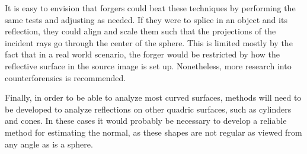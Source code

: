 \documentclass{thesis}
\begin{document}
It is easy to envision that forgers could beat these techniques by performing the same tests and adjusting as needed. If they were to splice in an object and its reflection, they could align and scale them such that the projections of the incident rays go through the center of the sphere. This is limited mostly by the fact that in a real world scenario, the forger would be restricted by how the reflective surface in the source image is set up. Nonetheless, more research into counterforensics is recommended.

Finally, in order to be able to analyze most curved surfaces, methods will need to be developed to analyze reflections on other quadric surfaces, such as cylinders and cones. In these cases it would probably be necessary to develop a reliable method for estimating the normal, as these shapes are not regular as viewed from any angle as is a sphere.


\clearpage


\end{document}
